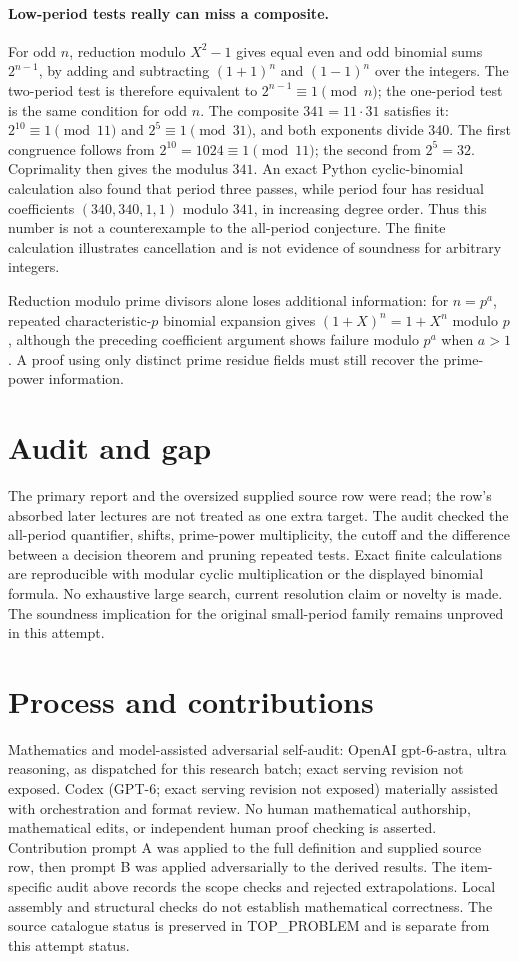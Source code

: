 \documentclass[11pt]{article}
\begin{document}
\paragraph{Low-period tests really can miss a composite.}
For odd $n$, reduction modulo $X^2-1$ gives equal even and odd
binomial sums $2^{n-1}$, by adding and subtracting
$(1+1)^n$ and $(1-1)^n$ over the integers. The two-period test is
therefore equivalent to $2^{n-1}\equiv1\pmod n$; the one-period test
is the same condition for odd $n$.
The composite $341=11\cdot31$ satisfies it: $2^{10}\equiv1\pmod{11}$
and $2^5\equiv1\pmod{31}$, and both exponents divide $340$.
The first congruence follows from $2^{10}=1024\equiv1\pmod{11}$;
the second from $2^5=32$. Coprimality then gives the modulus $341$.
An exact Python cyclic-binomial calculation also found that period three
passes, while period four has residual coefficients
$(340,340,1,1)$ modulo $341$, in increasing degree order.
Thus this number is not a counterexample to the all-period conjecture.
The finite calculation illustrates cancellation and is not evidence of
soundness for arbitrary integers.

Reduction modulo prime divisors alone loses additional information:
for $n=p^a$, repeated characteristic-$p$ binomial expansion gives
$(1+X)^n=1+X^n$ modulo $p$, although the preceding coefficient argument
shows failure modulo $p^a$ when $a>1$. A proof using only distinct
prime residue fields must still recover the prime-power information.

\section{Audit and gap}
The primary report and the oversized supplied source row were read;
the row's absorbed later lectures are not treated as one extra target.
The audit checked the all-period quantifier, shifts, prime-power
multiplicity, the cutoff and the difference between a decision theorem
and pruning repeated tests. Exact finite calculations are reproducible
with modular cyclic multiplication or the displayed binomial formula.
No exhaustive large search, current resolution claim or novelty is made.
The soundness implication for the original small-period family remains
unproved in this attempt.

\section{Process and contributions}
Mathematics and model-assisted adversarial self-audit: OpenAI gpt-6-astra, ultra reasoning, as dispatched for this research batch; exact serving revision not exposed. Codex (GPT-6; exact serving revision not exposed) materially assisted with orchestration and format review. No human mathematical authorship, mathematical edits, or independent human proof checking is asserted.
Contribution prompt A was applied to the full definition and supplied source row, then prompt B was applied adversarially to the derived results. The item-specific audit above records the scope checks and rejected extrapolations. Local assembly and structural checks do not establish mathematical correctness. The source catalogue status is preserved in TOP\_PROBLEM and is separate from this attempt status.
\end{document}
